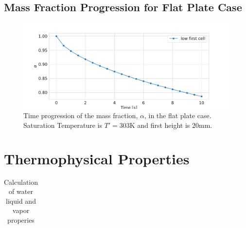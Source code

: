 \documentclass[12pt]{article}
\numberwithin{equation}{section}
\begin{document}
\begin{appendices}
\subsection{Mass Fraction Progression for Flat Plate Case}
\begin{figure}[H]
    \centering
    \includegraphics[trim={0 0 0 20},clip,width=1\textwidth]{Figures/mass_fraction_time_progression.pdf}
    \caption{Time progression of the mass fraction, $\alpha$, in the flat plate case. Saturation Temperature is $T'=303\mathrm{K}$ and first height is $20\mathrm{mm}$.}
    \label{f:Mass_Fraction_het}
\end{figure}
\section{Thermophysical Properties}\label{s:appendix B}
\begin{table}[H]
    
    \centering
    \caption{Calculation of water liquid and vapor properies}
    \renewcommand{\arraystretch}{2}
    \begin{tabular}{||c|c||}
        

\end{tabular}
\end{table}
\end{appendices}
\end{document}
